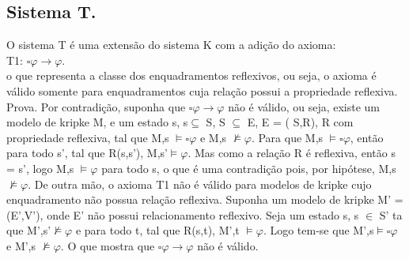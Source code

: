 \documentclass[12pt]{report}
\begin{document}
\subsection{Sistema T.}%
\hspace{0.5cm} O sistema T é uma extensão do sistema K com a adição do axioma:\\
T1: $\square \varphi \rightarrow \varphi $.\\
o que representa a classe dos enquadramentos reflexivos, ou seja, o axioma é válido somente para enquadramentos cuja relação possui a propriedade reflexiva.\\
Prova. Por contradição, suponha que $\square \varphi \rightarrow \varphi $ não é válido, ou seja, existe um modelo de kripke M, e um estado s, s$ \subseteq $ S, S $\subseteq $ E, E = ( S,R), R com propriedade reflexiva, tal que M,s $\models \square \varphi $ e M,s $\nvDash \varphi $. Para que M,s $\models \square \varphi $, então para todo s', tal que R(s,s'), M,s'$\models \varphi $. Mas como a relação R é reflexiva, então s = s', logo M,s $\models \varphi $ para todo s, o que é uma contradição pois, por hipótese, M,s $\nvDash \varphi $. De outra mão, o axioma T1 não é válido para modelos de kripke cujo enquadramento não possua relação reflexiva. Suponha um modelo de kripke M' = (E',V'), onde E' não possui relacionamento reflexivo. Seja um estado s, s $\in $ S' ta que M',s'$\nvDash \varphi $ e para todo t, tal que R(s,t), M',t $\models \varphi $. Logo tem-se que M',s$\models \square \varphi $ e M',s $\nvDash \varphi $. O que mostra que $\square \varphi \rightarrow \varphi $ não é válido.
\end{document}
